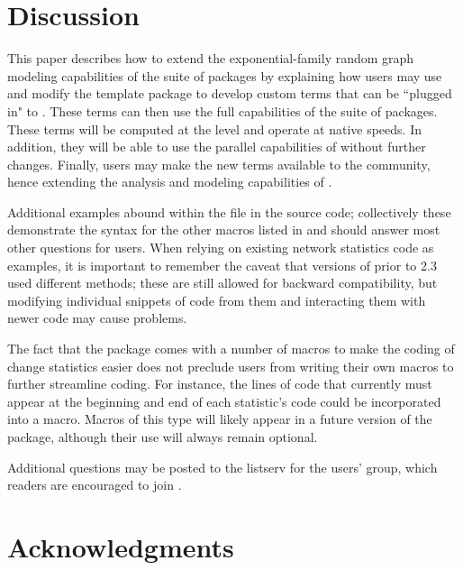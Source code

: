 \documentclass[nojss]{jss}
\begin{document}
\section{Discussion}

This paper describes how to extend the exponential-family random graph modeling
capabilities of the  suite of packages by
explaining how users may use and modify the template package  to develop custom terms that can be ``plugged in" to . These terms can then use the full capabilities of the  suite of packages.
These terms will be computed at the  level and operate at native speeds. In
addition, they will be able to use the parallel capabilities of 
without further changes. 
Finally, users may make the new terms
available to the  community, hence extending the analysis and
modeling capabilities of .

Additional examples abound within the  file in the source
code; collectively these demonstrate the syntax for the other macros listed in
 and should answer most other questions for users. When
relying on existing network statistics code as examples, it is important to
remember the caveat that versions of  prior to 2.3 used different
methods; these are still allowed for backward compatibility, but modifying
individual snippets of code from them and interacting them with newer code may
cause problems.

The fact that the  package comes with a number of macros to
make the coding of change statistics easier does not preclude users from
writing their own macros to further streamline coding. For
instance, the lines of code that currently must appear at the beginning and end
of each statistic's  code could be incorporated into a macro. Macros
of this type will likely appear in a future version
of the  package, although their use will always remain
optional.

Additional questions may be posted to the listserv for the  users'
group, which readers are encouraged to join \citep{statnetusersgroup}.

\section*{Acknowledgments}
\end{document}
